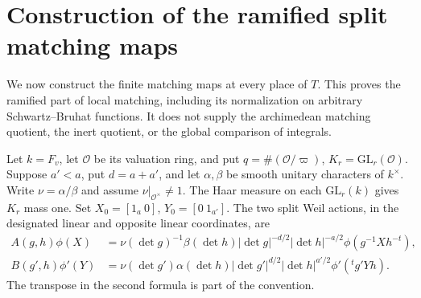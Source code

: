 \section{Construction of the ramified split matching maps}
\label{sec:sr-ramified-matching-construction}

We now construct the finite matching maps at every place of \(T\).
This proves the ramified part of local matching, including its
normalization on arbitrary Schwartz--Bruhat functions.  It does not
supply the archimedean matching quotient, the inert quotient, or the
global comparison of integrals.

Let \(k=F_v\), let \(\mathcal O\) be its valuation ring, and put
\(q=\#(\mathcal O/\varpi)\), \(K_r=\mathrm{GL}_r(\mathcal O)\).
Suppose \(a'<a\), put \(d=a+a'\), and let \(\alpha,\beta\) be
smooth unitary characters of \(k^\times\).  Write
\(\nu=\alpha/\beta\) and assume \(\nu|_{\mathcal O^\times}\ne1\).
The Haar measure on each \(\mathrm{GL}_r(k)\) gives \(K_r\)
mass one.  Set \(X_0=[1_a\ 0]\), \(Y_0=[0\ 1_{a'}]\).
The two split Weil actions, in the designated linear and opposite
linear coordinates, are
\begin{align}
 A(g,h)\phi(X)
 &=\nu(\det g)^{-1}\beta(\det h)
       |\det g|^{-d/2}|\det h|^{-a/2}
                    \phi(g^{-1}Xh^{-t}),\label{eq:sr-ram-action-A}\\
 B(g',h)\phi'(Y)
 &=\nu(\det g')\alpha(\det h)
       |\det g'|^{d/2}|\det h|^{a'/2}
                    \phi'({}^tg'Yh).\label{eq:sr-ram-action-B}
\end{align}
The transpose in the second formula is part of the convention.

